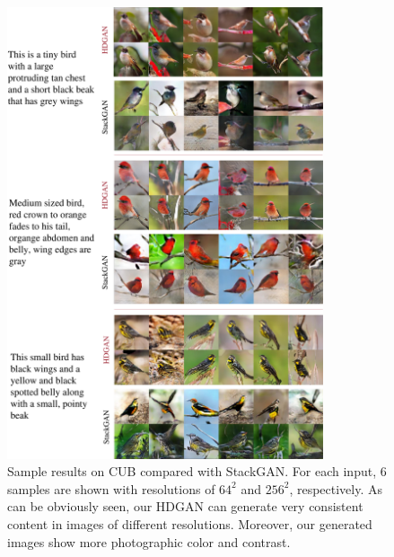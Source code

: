 \documentclass[10pt, letterpaper]{article}
\begin{document}
\begin{figure}[th!]
    \centering
    \includegraphics[width=0.83\textwidth]{figure/supp_bird2.pdf}
    
    \caption{Sample results on CUB compared with StackGAN. For each input, 6 samples are shown with resolutions of $64^2$ and $256^2$, respectively. As can be obviously seen, our HDGAN can generate very consistent content in images of different resolutions. Moreover, our generated images show more photographic color and contrast.  }  
    \label{fig:bird2}
\end{figure}
\newpage
\end{document}
